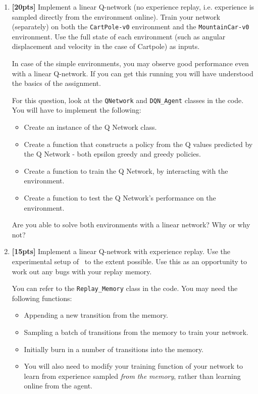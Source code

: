 \documentclass[12pt]{article}
\begin{document}
\begin{enumerate}

    \item\textbf{[20pts]} Implement a linear Q-network (no experience replay, i.e. experience is sampled directly from the environment online). Train your network (separately) on both the \texttt{CartPole-v0} environment and the \texttt{MountainCar-v0} environment. Use the full state of each environment (such as angular displacement and velocity in the case of Cartpole) as inputs.
              
    In case of the simple environments, you may observe good performance even with a linear Q-network. If you can get this running you will have understood the basics of the assignment. 
    
    For this question, look at the \texttt{QNetwork} and \texttt{DQN\_Agent} classes in the code. You will have to implement the following: 
    \begin{itemize}
        \item Create an instance of the Q Network class.
        \item Create a function that constructs a policy from the Q values predicted by the Q Network - both epsilon greedy and greedy policies.
        \item Create a function to train the Q Network, by interacting with the environment.
        \item  Create a function to test the Q Network's performance on the environment.
    \end{itemize}
    
    Are you able to solve both environments with a linear network? Why or why not? 

    \item \textbf{[15pts]} Implement a linear Q-network with experience replay. Use the experimental setup of~\cite{mnih2013playing, mnih2015human} to the extent possible. Use this as an opportunity to work out any bugs with your replay memory.
    
    You can refer to the \texttt{Replay\_Memory} class in the code. You may need the following functions: 
    \begin{itemize}
        \item Appending a new transition from the memory. 
        \item Sampling a batch of transitions from the memory to train your network. 
        \item Initially burn in a number of transitions into the memory. 
        \item You will also need to modify your training function of your network to learn from experience sampled \textit{from the memory}, rather than learning online from the agent. 
    \end{itemize}
              

\end{enumerate}
\end{document}
